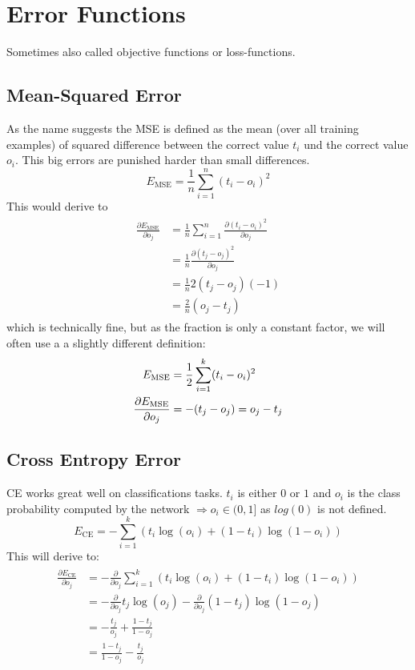 \section{Error Functions}\label{sec:error-functions}
Sometimes also called objective functions or loss-functions.

\subsection{Mean-Squared Error}\label{sec:mse}
As the name suggests the \gls{MSE} is defined as the mean (over all training examples) of squared difference between the correct value $t_i$ und the correct value $o_i$. This big errors are punished harder than small differences.
\begin{equation}\label{eq:mse}
E_{\text{MSE}} = \frac{1}{n} \sum_{i=1}^n (t_i - o_i)^2
\end{equation}
This would derive to
\begin{align}
\begin{split}
\frac{\partial E_{\text{MSE}}}{\partial o_j}
&= \frac{1}{n} \sum_{i=1}^n \frac{\partial (t_i - o_i)^2}{\partial o_j}\\
&= \frac{1}{n} \frac{\partial (t_j - o_j)^2}{\partial o_j}\\
&= \frac{1}{n} 2 (t_j - o_j) (-1)\\
&= \frac{2}{n} (o_j - t_j)
\end{split}
\end{align}
which is technically fine, but as the fraction is only a constant factor, we will often use a a slightly different definition:
\begin{align}\label{ed:mse2}
E_{\text{MSE}} &= \frac{1}{2} \sum_{i=1}^k (t_i - o_i)^2\\
\frac{\partial E_{\text{MSE}}}{\partial o_j}
&= - (t_j - o_j) = o_j - t_j
\end{align}

\subsection{Cross Entropy Error}\label{sec:ce}
\Gls{CE} works great well on classifications tasks. $t_i$ is either $0$ or $1$ and $o_i$ is the class probability computed by the network $\Rightarrow o_i \in (0, 1]$ as $log(0)$ is not defined.
\begin{equation}\label{eq:ce}
E_{\text{CE}} = - \sum_{i=1}^k \left( t_i \log(o_i) + (1 - t_i) \log(1 - o_i) \right)
\end{equation}
This will derive to:
\begin{align}
\begin{split}
\frac{\partial E_{\text{CE}}}{\partial o_j} &= - \frac{\partial}{\partial o_j} \sum_{i=1}^k \left( t_i \log(o_i) + (1 - t_i) \log(1 - o_i) \right)\\
&= - \frac{\partial}{\partial o_j} t_j \log(o_j) - \frac{\partial}{\partial o_j} (1 - t_j) \log(1 - o_j)\\
&= - \frac{t_j}{o_j} + \frac{1 - t_j}{1 - o_j}\\
&= \frac{1 - t_j}{1 - o_j} - \frac{t_j}{o_j}
\end{split}
\end{align}

